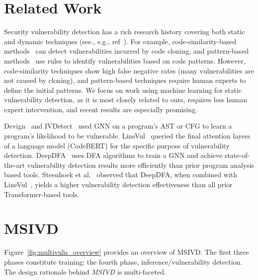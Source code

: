 \documentclass[12pt,openany,oneside,table]{cmuthesis}
\begin{document}
\section{Related Work}

Security vulnerability detection has a rich research history covering both static and dynamic techniques (see., e.g., ref~\cite{sokMemory,secVulSurvey,fuzzingSurvey}). For example, code-similarity-based methods~\cite{vuddy, vulpecker} can detect vulnerabilities incurred by code cloning, and pattern-based methods~\cite{neuhaus2007predicting, chucky} use rules to identify vulnerabilities based on code patterns. However, code-similarity techniques show high false negative rates (many vulnerabilities are not caused by cloning), and pattern-based techniques require human experts to define the initial patterns. We focus on work using machine learning for static vulnerability detection, as it is most closely related to ours, requires less human expert intervention, and recent results are especially promising.

Devign~\cite{zhou2019devign} and IVDetect~\cite{ivdetect} used GNN on a program's AST or CFG to learn a program's likelihood to be vulnerable. LineVul~\cite{linevd} queried the final attention layers of a language model (CodeBERT) for the specific purpose of vulnerability detection. DeepDFA~\cite{deepdfa} uses DFA algorithms to train a GNN and achieve state-of-the-art vulnerability detection results more efficiently than prior program analysis based tools. Steenhoek et al.~\cite{deepdfa} observed that DeepDFA, when combined with LineVul~\cite{linevd}, yields a higher vulnerability detection effectiveness than all prior Transformer-based tools.

\section{MSIVD}

Figure~\ref{fig:multivuln_overview} provides an overview of MSIVD. The first three phases constitute training; the fourth phase, inference/vulnerability detection.
The design rationale behind \textit{MSIVD} is multi-faceted.  
\end{document}
